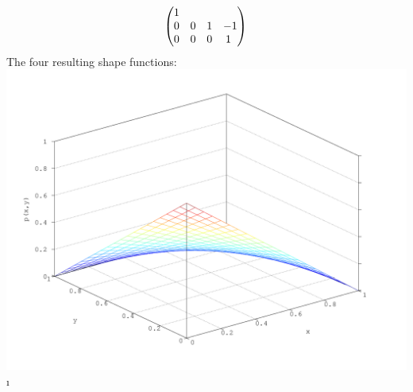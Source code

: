 \documentclass[a4paper,12pt]{article}
\begin{document}
\[\begin{pmatrix}
1\\0&0&1&-1\\0&0&0&1\
\end{pmatrix}\\\]
\newpage
The four resulting shape functions:\\
\includegraphics[scale=0.35]{P1} \i
\end{document}
